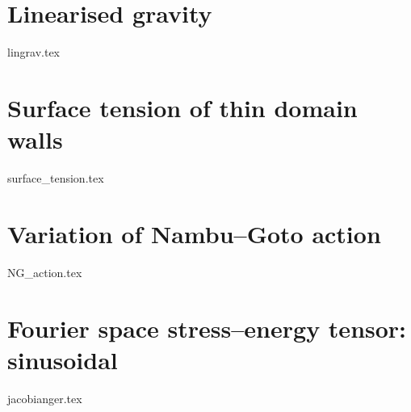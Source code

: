 




\section{Linearised gravity}\label{app:derivations:gws}
    {{lingrav.tex}}


\section{Surface tension of thin domain walls}\label{app:derivations:surface_tension}
    {{surface_tension.tex}}


    
\section{Variation of Nambu--Goto action}\label{app:derivations:NG_action}
    {{NG_action.tex}}

    


\section{Fourier space stress--energy tensor: sinusoidal}\label{app:derivations:jacobianger}
    {{jacobianger.tex}}


